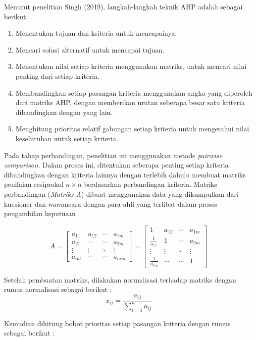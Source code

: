 \documentclass[journal,article,submit,pdftex,moreauthors]{Definitions/mdpi}
\begin{document}
Menurut penelitian Singh (2019), langkah-langkah teknik AHP adalah sebagai berikut:
\begin{enumerate}
    \item Menentukan tujuan dan kriteria untuk mencapainya.
    \item Mencari solusi alternatif untuk mencapai tujuan.
    \item Menentukan nilai setiap kriteria menggunakan matriks, untuk mencari nilai penting dari setiap kriteria.
    \item Membandingkan setiap pasangan kriteria menggunakan angka yang diperoleh dari matriks AHP, dengan memberikan urutan seberapa besar satu kriteria dibandingkan dengan yang lain.
    \item Menghitung prioritas relatif gabungan setiap kriteria untuk mengetahui nilai keseluruhan untuk setiap kriteria.
\end{enumerate}

Pada tahap perbandingan, penelitian ini menggunakan metode \textit{pairwise comparison}. Dalam proses ini, ditentukan seberapa penting setiap kriteria dibandingkan dengan kriteria lainnya dengan terlebih dahulu membuat matriks penilaian resiprokal $n \times n$ berdasarkan perbandingan kriteria. Matriks perbandingan (\textit{Matriks A}) dibuat menggunakan data yang dikumpulkan dari kuesioner dan wawancara dengan para ahli yang terlibat dalam proses pengambilan keputusan \cite{Singh2019}.


\[
A = \begin{bmatrix}
a_{11} & a_{12} & \cdots & a_{1m} \\
a_{21} & \cdots & \cdots & a_{2m} \\
\vdots & \vdots & \ddots & \vdots \\
a_{m1} & \cdots & \cdots & a_{mm}
\end{bmatrix} = 
\begin{bmatrix}
1 & a_{12} & \cdots & a_{1m} \\
\frac{1}{a_{12}} & 1 & \cdots & a_{2m} \\
\vdots & \vdots & \ddots & \vdots \\
\frac{1}{a_{1m}} & \cdots & \cdots & 1
\end{bmatrix}
\]


Setelah pembuatan matriks, dilakukan normalisasi terhadap matriks dengan rumus normalisasi sebagai berikut \cite{Singh2019}:
\[
x_{ij} = \frac{a_{ij}}{\sum_{i=1}^{n} a_{ij}}
\]

Kemudian dihitung bobot prioritas setiap pasangan kriteria dengan rumus sebagai berikut \cite{Singh2019}:
\end{document}
